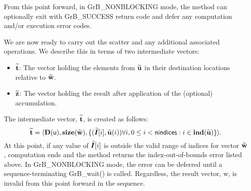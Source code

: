 From this point forward, in {\sf GrB\_NONBLOCKING} mode, the method can 
optionally exit with {\sf GrB\_SUCCESS} return code and defer any computation 
and/or execution error codes.

We are now ready to carry out the scatter and any additional 
associated operations.  We describe this in terms of two intermediate vectors:
\begin{itemize}
    \item ${\bf \widetilde{t}}$: The vector holding the elements from
    ${\bf \widetilde{u}}$ in their destination locations relative to 
    ${\bf \widetilde{w}}$.
    
    \item ${\bf \widetilde{z}}$: The vector holding the result after 
    application of the (optional) accumulation.
\end{itemize}

The intermediate vector, ${\bf \widetilde{t}}$, is created as follows:
\[
{\bf \widetilde{t}} = \langle
\bold{D}({\sf u}), \bold{size}({\bf \widetilde{w}}),
\{(\bm{\widetilde{I}}[i],{\bf \widetilde{u}}(i)) \forall i, 0 \leq i < {\sf nindices} : 
i \in \bold{ind}({\bf \widetilde{u}}) \} \rangle. 
\]
At this point, if any value of $\bm{\widetilde{I}}[i]$ is outside the valid 
range of indices for vector ${\bf \widetilde{w}}$, computation ends and the 
method returns the index-out-of-bounds error listed above. In 
{\sf GrB\_NONBLOCKING} mode, the error can be deferred until a 
sequence-terminating {\sf GrB\_wait()} is called.  Regardless, the result 
vector, {\sf w}, is invalid from this point forward in the 
sequence.

